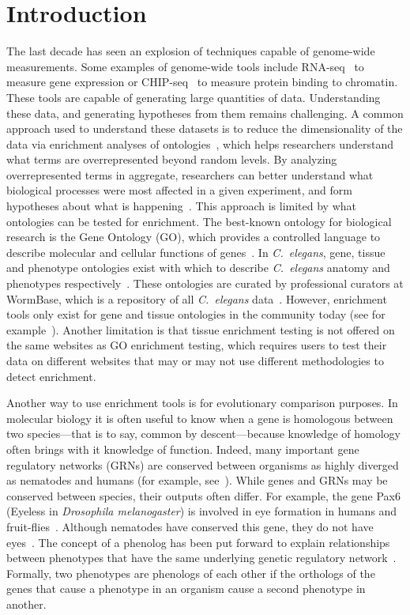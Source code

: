 \documentclass[10pt,letterpaper,twocolumn]{article}
\newcommand{\cel}{\emph{C.~elegans}}
\begin{document}
\section*{Introduction}
The last decade has seen an explosion of techniques capable of genome-wide
measurements. Some examples of genome-wide tools include
RNA-seq~\cite{Mortazavi2008} to measure gene expression or
CHIP-seq~\cite{Johnson2007} to measure protein binding to chromatin. These tools are capable
of generating large quantities of data. Understanding these data, and generating
hypotheses from them remains challenging. A common approach used to understand
these datasets is to reduce the dimensionality of the data via enrichment
analyses of ontologies~\cite{TheGeneOntologyConsortium2000a}, which helps
researchers understand what terms are
overrepresented beyond random levels. By analyzing overrepresented terms in
aggregate, researchers can better understand what biological processes were most
affected in a given experiment, and form hypotheses about what is
happening~\cite{Rhee2008}.
This approach is limited by what ontologies can be tested for enrichment.
The best-known ontology for biological research is the Gene Ontology (GO), which
provides a controlled language to describe molecular and cellular functions of
genes~\cite{TheGeneOntologyConsortium2000a}.
In \cel{}, gene, tissue and phenotype ontologies exist
with which to describe \cel{} anatomy and phenotypes
respectively~\cite{Schindelman2011,Lee2003}. These ontologies are curated by
professional curators at WormBase, which is a repository of all \cel{}
data~\cite{Howe2016}.
However, enrichment tools
only exist for gene and tissue ontologies
in the community today (see for example~\cite{Chikina2009,Mi2013,Angeles-Albores2016}).
Another limitation is that
tissue enrichment testing is not offered on the same websites as GO enrichment
testing, which requires users to test their data on different websites that may
or may not use different methodologies to detect enrichment.

Another way to use enrichment tools is for evolutionary comparison purposes.
In molecular biology it is often useful to know when a gene is homologous
between two species---that is to say, common by descent---because knowledge of
homology often brings with it knowledge of function. Indeed, many
important gene regulatory networks (GRNs) are conserved between organisms as
highly diverged as nematodes and humans (for example, see~\cite{Sternberg1998}).
While genes and GRNs may be conserved between species, their outputs often differ.
For example, the gene Pax6 (Eyeless in \emph{Drosophila melanogaster})
is involved in eye formation in humans and fruit-flies~\cite{Quiring1994}. Although
nematodes have conserved this gene, they do not have eyes~\cite{Zhang1995,Chisholm1995}.
The concept of a phenolog has been put forward to explain relationships between
phenotypes that have the same underlying genetic
regulatory network~\cite{McGary2010,Lehner2013}.
Formally, two phenotypes are phenologs of each other if the orthologs of the
genes that cause a phenotype in an organism cause a second phenotype in another.
\end{document}
